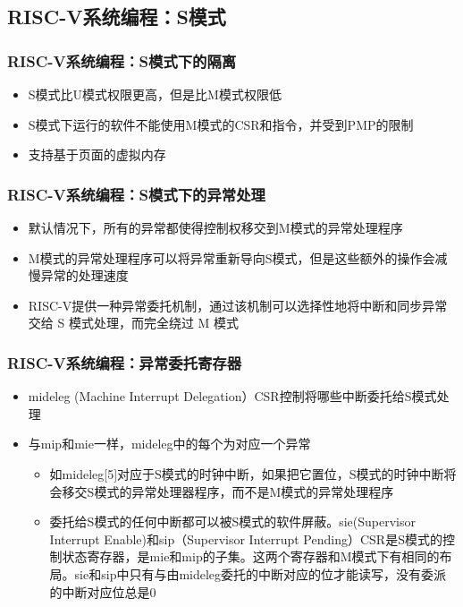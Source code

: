 \subsection{RISC-V系统编程：S模式}

\begin{frame}
    \frametitle{RISC-V系统编程：S模式下的隔离}
    \begin{itemize}
        \item S模式比U模式权限更高，但是比M模式权限低
        \item S模式下运行的软件不能使用M模式的CSR和指令，并受到PMP的限制
        \item 支持基于页面的虚拟内存
        
    \end{itemize}
    
\end{frame}


\begin{frame}
    \frametitle{RISC-V系统编程：S模式下的异常处理}
    \begin{itemize}
        \item 默认情况下，所有的异常都使得控制权移交到M模式的异常处理程序
        \item M模式的异常处理程序可以将异常重新导向S模式，但是这些额外的操作会减慢异常的处理速度
        \item RISC-V提供一种异常委托机制，通过该机制可以选择性地将中断和同步异常交给 S 模式处理，而完全绕过 M 模式
        
    \end{itemize}
   
    
\end{frame}


\begin{frame}
    \frametitle{RISC-V系统编程：异常委托寄存器}
    \begin{itemize}
        \item mideleg (Machine Interrupt Delegation）CSR控制将哪些中断委托给S模式处理
        \item 与mip和mie一样，mideleg中的每个为对应一个异常
        \begin{itemize}
            \item 如mideleg[5]对应于S模式的时钟中断，如果把它置位，S模式的时钟中断将会移交S模式的异常处理器程序，而不是M模式的异常处理程序
            \item 委托给S模式的任何中断都可以被S模式的软件屏蔽。sie(Supervisor Interrupt Enable)和sip（Supervisor Interrupt Pending）CSR是S模式的控制状态寄存器，是mie和mip的子集。这两个寄存器和M模式下有相同的布局。sie和sip中只有与由mideleg委托的中断对应的位才能读写，没有委派的中断对应位总是0    
        \end{itemize}
        
    \end{itemize}
    
\end{frame}

